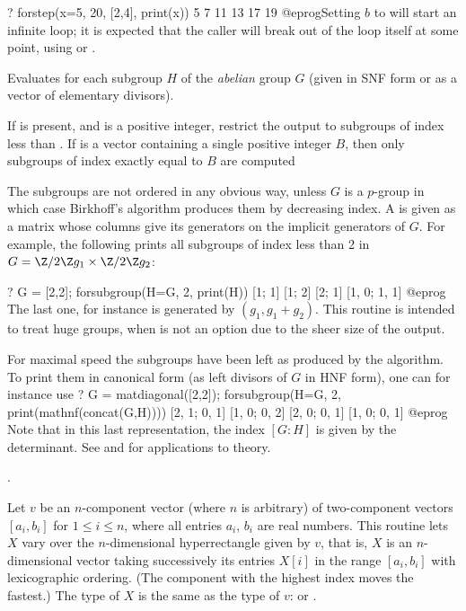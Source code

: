 \bprog
? forstep(x=5, 20, [2,4], print(x))
5
7
11
13
17
19
@eprog\noindent Setting $b$ to  will start an infinite loop; it is
expected that the caller will break out of the loop itself at some point,
using  or .

\label{se:forsubgroup}
Evaluates  for
each subgroup $H$ of the \emph{abelian} group $G$ (given in
SNF form or as a vector of elementary divisors).

If  is present, and is a positive integer, restrict the output to
subgroups of index less than . If  is a vector
containing a single positive integer $B$, then only subgroups of index
exactly equal to $B$ are computed

The subgroups are not ordered in any
obvious way, unless $G$ is a $p$-group in which case Birkhoff's algorithm
produces them by decreasing index. A  is given as a matrix
whose columns give its generators on the implicit generators of $G$. For
example, the following prints all subgroups of index less than 2 in $G =
\Z/2\Z g_1 \times \Z/2\Z g_2$:

\bprog
? G = [2,2]; forsubgroup(H=G, 2, print(H))
[1; 1]
[1; 2]
[2; 1]
[1, 0; 1, 1]
@eprog\noindent
The last one, for instance is generated by $(g_1, g_1 + g_2)$. This
routine is intended to treat huge groups, when  is not an
option due to the sheer size of the output.

For maximal speed the subgroups have been left as produced by the algorithm.
To print them in canonical form (as left divisors of $G$ in HNF form), one
can for instance use
\bprog
? G = matdiagonal([2,2]); forsubgroup(H=G, 2, print(mathnf(concat(G,H))))
[2, 1; 0, 1]
[1, 0; 0, 2]
[2, 0; 0, 1]
[1, 0; 0, 1]
@eprog\noindent
Note that in this last representation, the index $[G:H]$ is given by the
determinant. See  and  for
applications to  theory.

.

\label{se:forvec}
Let $v$ be an $n$-component
vector (where $n$ is arbitrary) of two-component vectors $[a_i,b_i]$
for $1\le i\le n$, where all entries $a_i$, $b_i$ are real numbers.
This routine lets $X$ vary over the $n$-dimensional hyperrectangle
given by $v$, that is, $X$ is an $n$-dimensional vector taking
successively its entries $X[i]$ in the range $[a_i,b_i]$ with lexicographic
ordering. (The component with the highest index moves the fastest.)
The type of $X$ is the same as the type of $v$:  or .

